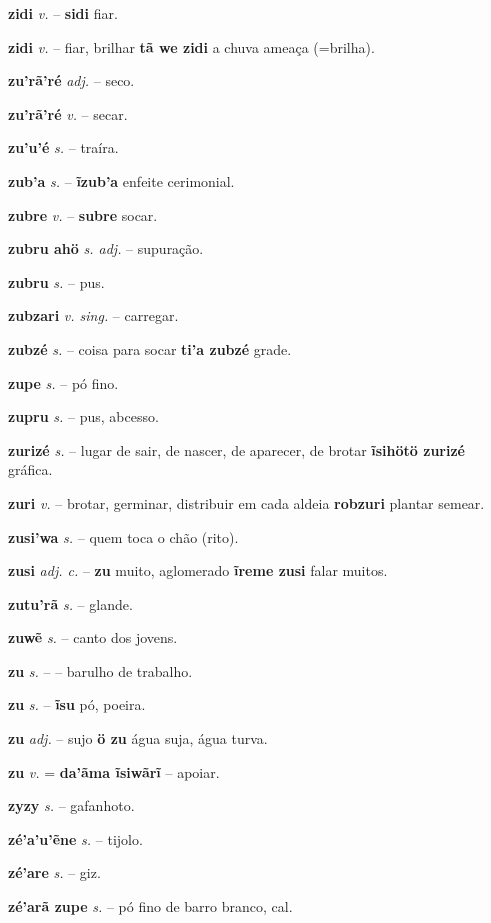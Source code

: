 \textbf{zidi} \textit{v.} -- \textbf{sidi} fiar.

\textbf{zidi} \textit{v.} -- fiar, brilhar  \textbf{tã we zidi} a chuva ameaça (=brilha).

\textbf{zu'rã'ré} \textit{adj.} -- seco.

\textbf{zu'rã'ré} \textit{v.} -- secar.

\textbf{zu'u'é} \textit{s.} -- traíra.

\textbf{zub'a} \textit{s.} -- \textbf{ĩzub'a} enfeite cerimonial.

\textbf{zubre} \textit{v.} -- \textbf{subre} socar.

\textbf{zubru ahö} \textit{s. adj.} -- supuração.

\textbf{zubru} \textit{s.} -- pus.

\textbf{zubzari} \textit{v. sing.} -- carregar.

\textbf{zubzé} \textit{s.} -- coisa para socar  \textbf{ti'a zubzé} grade.

\textbf{zupe} \textit{s.} -- pó fino.

\textbf{zupru} \textit{s.} -- pus, abcesso.

\textbf{zurizé} \textit{s.} -- lugar de sair, de nascer, de aparecer, de brotar  \textbf{ĩsihötö zurizé} gráfica.

\textbf{zuri} \textit{v.} -- brotar, germinar, distribuir em cada aldeia  \textbf{robzuri} plantar  semear.

\textbf{zusi'wa} \textit{s.} -- quem toca o chão (rito).

\textbf{zusi} \textit{adj. c.} -- \textbf{zu} muito, aglomerado  \textbf{ĩreme zusi} falar muitos.

\textbf{zutu'rã} \textit{s.} -- glande.

\textbf{zuwẽ} \textit{s.} -- canto dos jovens.

\textbf{zu} \textit{ s.} -- -- barulho de trabalho.

\textbf{zu} \textit{ s.} -- \textbf{ĩsu} pó, poeira.

\textbf{zu} \textit{adj.} -- sujo  \textbf{ö zu} água suja, água turva.

\textbf{zu} \textit{v.} = \textbf{da'ãma ĩsiwãrĩ} -- apoiar.

\textbf{zyzy} \textit{s.} -- gafanhoto.

\textbf{zé'a'u'ẽne} \textit{s.} -- tijolo.

\textbf{zé'are} \textit{s.} -- giz.

\textbf{zé'arã zupe} \textit{s.} -- pó fino de barro branco, cal.

